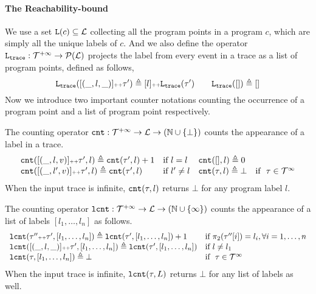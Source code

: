 \paragraph{The Reachability-bound}
We use a set $\mathtt{L}(c) \subseteq \mathcal{L}$ collecting all the program points in a program $c$, which are simply all the unique labels of $c$.
%
And we also define the operator $\mathtt{L}_{\mathtt{{trace}}} : \mathcal{T}^{+\infty} \to \mathcal{P}{(\mathcal{L})}$ projects the label from every event in a trace as a list of program points,
defined as follows,
\[
\mathtt{L}_{\mathtt{{trace}}}([(\_, l, \_)] {\scriptscriptstyle ++} \mathtt{\tau}') \triangleq [l] {\scriptscriptstyle ++} \mathtt{L}_{\mathtt{{trace}}}(\mathtt{\tau}')
\qquad
\mathtt{L}_{\mathtt{{trace}}}([ ]) \triangleq []
\]
Now we introduce two important counter notations counting the occurrence of a program point and a list of program point respectively.
\begin{defn}
  \label{def:counter}
The counting operator $\mathtt{cnt} : \mathcal{T}^{+\infty} \to \mathcal{L} \to (\mathbb{N} \cup \{\bot\})$
counts the appearance of a label in a trace.
\[
\begin{array}{llll}
\mathtt{cnt}([(\_, l, v)] {\scriptscriptstyle ++} \mathtt{\tau}', l ) \triangleq \mathtt{cnt}(\mathtt{\tau}', l) + 1 & \text{if}~ l = l
&
\mathtt{cnt}({[]}, l) \triangleq 0 & 
\\
\mathtt{cnt}([(\_, l', v)] {\scriptscriptstyle ++} \mathtt{\tau}', l) \triangleq \mathtt{cnt}(\mathtt{\tau}', l)   & \text{if}~ l' \neq l
&
\mathtt{cnt}(\mathtt{\tau}, l) \triangleq \bot & \text{if }~ \mathtt{\tau} \in \mathcal{T}^{\infty}
\end{array}
\]
{When the input trace is infinite, $\mathtt{cnt}(\mathtt{\tau}, l)$ returns $\bot$ for any program label $l$.}
\end{defn}
\begin{defn}
  \label{def:lcounter}
  The counting operator $\mathtt{lcnt} : \mathcal{T}^{+\infty} \to \mathcal{L} \to (\mathbb{N} \cup \{\infty\})$
  counts the appearance of a list of labels $[l_1, \ldots, l_n]$ as follows.
\[
  \begin{array}{ll}
  \mathtt{lcnt}(\mathtt{\tau}'' {\scriptscriptstyle ++} \mathtt{\tau}', [l_1, \ldots, l_n] ) 
  \triangleq \mathtt{lcnt}(\mathtt{\tau}', [l_1, \ldots, l_n]) + 1  & \text{if}~ \pi_2(\mathtt{\tau}''[i]) = l_i, \forall i = 1, \ldots, n
  \\ 
  \mathtt{lcnt}([(\_, l, \_)] {\scriptscriptstyle ++} \mathtt{\tau}', [l_1, \ldots, l_n] ) 
  \triangleq \mathtt{lcnt}(\mathtt{\tau}', [l_1, \ldots, l_n]) & \text{if}~ l \neq l_1
  \\ 
  \mathtt{lcnt}(\mathtt{\tau}, [l_1, \ldots, l_n] ) 
  \triangleq \bot & \text{if }~ \mathtt{\tau} \in \mathcal{T}^{\infty}
\end{array}
\]
{When the input trace is infinite, $\mathtt{lcnt}(\mathtt{\tau}, L)$ returns $\bot$ for any list of labels as well.}
\end{defn}
